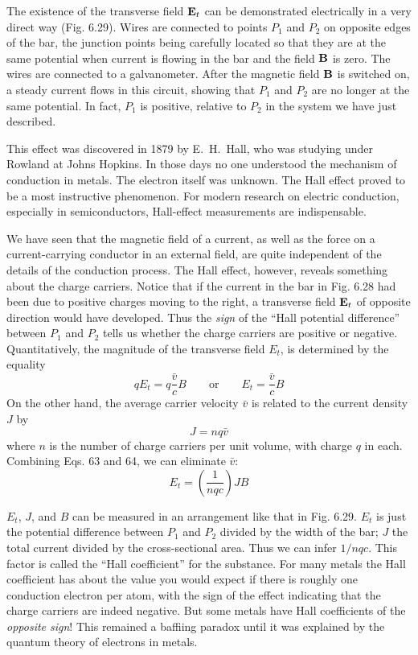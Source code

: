 The existence of the transverse field $\mathbf{E}_t$ can be demonstrated electrically
in a very direct way (Fig. 6.29). Wires are connected to
points $P_1$ and $P_2$ on opposite edges of the bar, the junction points
being carefully located so that they are at the same potential when
current is flowing in the bar and the field $\mathbf{B}$ is zero. The wires are
connected to a galvanometer. After the magnetic field $\mathbf{B}$ is switched
on, a steady current flows in this circuit, showing that $P_1$ and $P_2$ are
no longer at the same potential. In fact, $P_1$ is positive, relative to $P_2$
in the system we have just described.

This effect was discovered in 1879 by E.~H.~Hall, who was studying
under Rowland at Johns Hopkins. In those days no one understood
the mechanism of conduction in metals. The electron itself was 
unknown. The Hall effect proved to be a most instructive phenomenon.
For modern research on electric conduction, especially in 
semiconductors, Hall-effect measurements are indispensable.

We have seen that the magnetic field of a current, as well as the
force on a current-carrying conductor in an external field, are quite
independent of the details of the conduction process. The Hall
effect, however, reveals something about the charge carriers. Notice
that if the current in the bar in Fig. 6.28 had been due to positive
charges moving to the right, a transverse field $\mathbf{E}_t$ of opposite direction
would have developed. Thus the \emph{sign} of the ``Hall potential 
difference'' between $P_1$ and $P_2$ tells us whether the charge carriers are positive
or negative. Quantitatively, the magnitude of the transverse
field $E_t$, is determined by the equality
\begin{equation}
  qE_t = q\frac{\bar{v}}{c} B \qquad \text{or} \qquad E_t=\frac{\bar{v}}{c}B
\end{equation}
On the other hand, the average carrier velocity $\bar{v}$ is related to the
current density $J$ by
\begin{equation}
  J = nq\bar{v}
\end{equation}
where $n$ is the number of charge carriers per unit volume, with charge
$q$ in each. Combining Eqs. 63 and 64, we can eliminate $\bar{v}$:
\begin{equation}
  E_t = \left(\frac{1}{nqc}\right) JB
\end{equation}

$E_t$, $J$, and $B$ can be measured in an arrangement like that in
Fig. 6.29. $E_t$ is just the potential difference between $P_1$ and $P_2$ divided
by the width of the bar; $J$ the total current divided by the 
cross-sectional area. Thus we can infer $1 /nqc$. This factor is called the
``Hall coefficient'' for the substance. For many metals the Hall
coefficient has about the value you would expect if there is roughly
one conduction electron per atom, with the sign of the effect indicating
that the charge carriers are indeed negative. But some metals
have Hall coefficients of the \emph{opposite sign}! This remained a baffiing
paradox until it was explained by the quantum theory of electrons
in metals.
